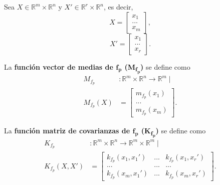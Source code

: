 \begin{defin*}
Sea $X \in \mathbb{R}^m \times \mathbb{R}^n$ y $X' \in \mathbb{R}^r \times \mathbb{R}^n$, es decir,
\begin{equation*}
    X =     
    \left[
        \begin{array}{c}
        x_1  \\
        ... \\
        x_m
        \end{array}
    \right],
\end{equation*}
\begin{equation*}
    X' =     
    \left[
        \begin{array}{c}
        x_1  \\
        ... \\
        x_r
        \end{array}
    \right].
\end{equation*}

La \textbf{función vector de medias de $\bm{f_p}$ (M\textsubscript{$\bm{f_p}$})} se define como
\begin{equation*}
\begin{aligned}
    M_{f_p}&: \mathbb{R}^m \times \mathbb{R}^n \rightarrow \mathbb{R}^m
    \mid\\
    M_{f_p}(X) &=     
    \left[
        \begin{array}{c}
        m_{f_p}(x_1)  \\
        ... \\
        m_{f_p}(x_m)
        \end{array}
    \right].
\end{aligned}
\end{equation*}

La \textbf{función matriz de covarianzas de $\bm{f_p}$ (K\textsubscript{$\bm{f_p}$})} se define como
\begin{equation*}
\begin{aligned}
    K_{f_p}&: \mathbb{R}^m \times \mathbb{R}^n \rightarrow \mathbb{R}^m \times \mathbb{R}^m
    \mid\\
    K_{f_p}(X,X') &=     
    \left[
        \begin{array}{ccc}
        k_{f_p}(x_1,x_1') & ... & k_{f_p}(x_1,x_r')  \\
        ... & ... & ... \\
        k_{f_p}(x_m,x_1') & ... & k_{f_p}(x_m,x_r')
        \end{array}
    \right].
\end{aligned}
\end{equation*}
\end{defin*}

